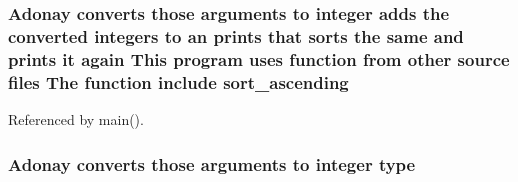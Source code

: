 \subsubsection[{sort\+\_\+ascending}]{\setlength{\rightskip}{0pt plus 5cm}Adonay converts those arguments to integer adds the converted integers to an prints that sorts the same and prints it again This program uses function from other source files The function include sort\+\_\+ascending}\label{readme_8txt_a8876740fc17331e967917bf66e441150}


Referenced by main().

\subsubsection[{type}]{\setlength{\rightskip}{0pt plus 5cm}Adonay converts those arguments to integer type}\label{readme_8txt_af246a86d1810514ff7ae8048a96c98e2}
